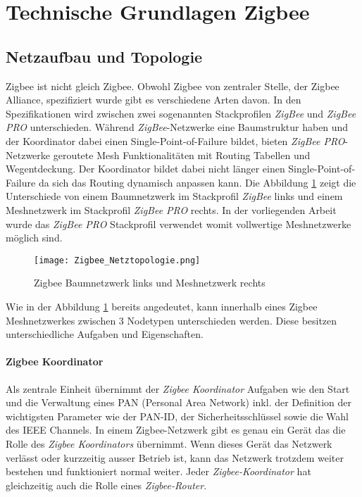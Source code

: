 \clearpage
\section{Technische Grundlagen Zigbee}\label{sec:TechnischeGrundlagenZigbee}

\subsection{Netzaufbau und Topologie}\label{subsec:ZigbeeNetzaufbauundTopologie}
Zigbee ist nicht gleich Zigbee. Obwohl Zigbee von zentraler Stelle, der Zigbee Alliance, spezifiziert wurde gibt es verschiedene Arten davon. In den Spezifikationen wird zwischen zwei sogenannten Stackprofilen \textit{ZigBee} und \textit{ZigBee PRO} unterschieden.
Während \textit{ZigBee}-Netzwerke eine Baumstruktur haben und der Koordinator dabei einen Single-Point-of-Failure bildet, bieten \textit{ZigBee PRO}-Netzwerke geroutete Mesh Funktionalitäten mit Routing Tabellen und Wegentdeckung. Der Koordinator bildet dabei nicht länger einen Single-Point-of-Failure da sich das Routing dynamisch anpassen kann.
Die Abbildung \ref{fig:NetzwerktopologienZigbee} zeigt die Unterschiede von einem Baumnetzwerk im Stackprofil \textit{ZigBee} links und einem Meshnetzwerk im Stackprofil \textit{ZigBee PRO} rechts.
In der vorliegenden Arbeit wurde das \textit{ZigBee PRO} Stackprofil verwendet womit vollwertige Meshnetzwerke möglich sind.

\begin{figure}[h]
	\centering
	\texttt{[image: Zigbee\_Netztopologie.png]}
	\caption{Zigbee Baumnetzwerk links und Meshnetzwerk rechts \cite[S.~221]{markus_krause_rainer_konrad_zigbee_2014}}	\label{fig:NetzwerktopologienZigbee}
\end{figure}

Wie in der Abbildung \ref{fig:NetzwerktopologienZigbee} bereits angedeutet, kann innerhalb eines Zigbee Meshnetzwerkes zwischen 3 Nodetypen unterschieden werden. Diese besitzen unterschiedliche Aufgaben und Eigenschaften.

\paragraph{Zigbee Koordinator}
Als zentrale Einheit übernimmt der \textit{Zigbee Koordinator} Aufgaben wie den Start und die Verwaltung eines PAN (Personal Area Network) inkl. der Definition der wichtigsten Parameter wie der PAN-ID, der Sicherheitsschlüssel sowie die Wahl des IEEE Channels.
In einem Zigbee-Netzwerk gibt es genau ein Gerät das die Rolle des \textit{Zigbee Koordinators} übernimmt. Wenn dieses Gerät das Netzwerk verlässt oder kurzzeitig ausser Betrieb ist, kann das Netzwerk trotzdem weiter bestehen und funktioniert normal weiter.
Jeder \textit{Zigbee-Koordinator} hat gleichzeitig auch die Rolle eines \textit{Zigbee-Router}.

